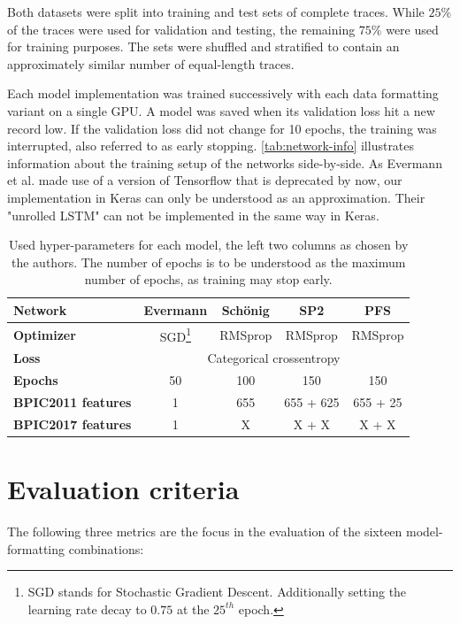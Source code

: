 Both datasets were split into training and test sets of complete traces. While $25\%$ of the traces were used for validation and testing, the remaining $75\%$ were used for training purposes. The sets were shuffled and stratified to contain an approximately similar number of equal-length traces.

Each model implementation was trained successively with each data formatting variant on a single GPU. A model was saved when its validation loss hit a new record low. If the validation loss did not change for 10 epochs, the training was interrupted, also referred to as early stopping. \autoref{tab:network-info} illustrates information about the training setup of the networks side-by-side. As Evermann et al. made use of a version of Tensorflow that is deprecated by now, our implementation in Keras can only be understood as an approximation. Their "unrolled LSTM" can not be implemented in the same way in Keras.

\begin{table}[ht!]
    \centering
    \begin{tabular}{lcccc}
        \textbf{Network} & \textbf{Evermann} & \textbf{Schönig} & \textbf{SP2} & \textbf{PFS}\\
        \hline
        \textbf{Optimizer} & SGD\footnote{SGD stands for Stochastic Gradient Descent. Additionally setting the learning rate decay to $0.75$ at the $25^{th}$ epoch.} & RMSprop  & RMSprop & RMSprop\\
        \textbf{Loss}    &\multicolumn{4}{c}{Categorical crossentropy}\\
        \textbf{Epochs}  & 50 & 100 & 150 & 150\\
        \textbf{BPIC2011 features} & 1 & 655 & 655 + 625 & 655 + 25 \\
        \textbf{BPIC2017 features} & 1 & X & X + X & X + X \\
    \end{tabular}
    \caption{Used hyper-parameters for each model, the left two columns as chosen by the authors. The number of epochs is to be understood as the maximum number of epochs, as training may stop early.}
    \label{tab:network-info}
\end{table}

\section{Evaluation criteria}
\label{sec:eval:criteria}
The following three metrics are the focus in the evaluation of the sixteen model-formatting combinations:

